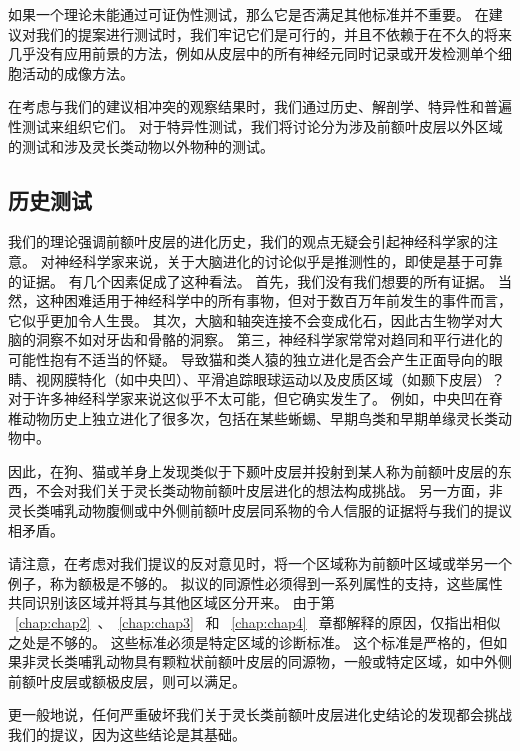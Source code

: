 如果一个理论未能通过可证伪性测试，那么它是否满足其他标准并不重要。
在建议对我们的提案进行测试时，我们牢记它们是可行的，并且不依赖于在不久的将来几乎没有应用前景的方法，例如从皮层中的所有神经元同时记录或开发检测单个细胞活动的成像方法。
\par


在考虑与我们的建议相冲突的观察结果时，我们通过历史、解剖学、特异性和普遍性测试来组织它们。
对于特异性测试，我们将讨论分为涉及前额叶皮层以外区域的测试和涉及灵长类动物以外物种的测试。



\subsection{历史测试}

我们的理论强调前额叶皮层的进化历史，我们的观点无疑会引起神经科学家的注意。
对神经科学家来说，关于大脑进化的讨论似乎是推测性的，即使是基于可靠的证据。
有几个因素促成了这种看法。
首先，我们没有我们想要的所有证据。
当然，这种困难适用于神经科学中的所有事物，但对于数百万年前发生的事件而言，它似乎更加令人生畏。
其次，大脑和轴突连接不会变成化石，因此古生物学对大脑的洞察不如对牙齿和骨骼的洞察。
第三，神经科学家常常对趋同和平行进化的可能性抱有不适当的怀疑。
导致猫和类人猿的独立进化是否会产生正面导向的眼睛、视网膜特化（如中央凹）、平滑追踪眼球运动以及皮质区域（如颞下皮层）？
对于许多神经科学家来说这似乎不太可能，但它确实发生了。
例如，中央凹在脊椎动物历史上独立进化了很多次，包括在某些蜥蜴、早期鸟类和早期单缘灵长类动物中\cite{ross2004tarsier}。
\par


因此，在狗、猫或羊身上发现类似于下颞叶皮层并投射到某人称为前额叶皮层的东西，不会对我们关于灵长类动物前额叶皮层进化的想法构成挑战。
另一方面，非灵长类哺乳动物腹侧或中外侧前额叶皮层同系物的令人信服的证据将与我们的提议相矛盾。
\par


请注意，在考虑对我们提议的反对意见时，将一个区域称为前额叶区域或举另一个例子，称为额极是不够的。
拟议的同源性必须得到一系列属性的支持，这些属性共同识别该区域并将其与其他区域区分开来。
由于第 ~\ref{chap:chap2}~、~\ref{chap:chap3}~ 和 ~\ref{chap:chap4}~ 章都解释的原因，仅指出相似之处是不够的。
这些标准必须是特定区域的诊断标准。
这个标准是严格的，但如果非灵长类哺乳动物具有颗粒状前额叶皮层的同源物，一般或特定区域，如中外侧前额叶皮层或额极皮层，则可以满足。
\par


更一般地说，任何严重破坏我们关于灵长类前额叶皮层进化史结论的发现都会挑战我们的提议，因为这些结论是其基础。



